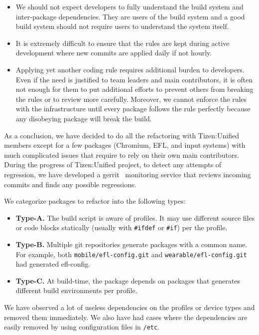 \begin{itemize}
\item We should not expect developers to fully understand the build system and inter-package dependencies.
They are users of the build system and a good build system should not require users to understand the system itself.
\item It is extremely difficult to ensure that the rules are kept during active development where new commits are applied daily if not hourly.
\item Applying yet another coding rule requires additional burden to developers.
Even if the need is justified to team leaders and main contributors, it is often not enough for them to put additional efforts to prevent others from breaking the rules or to review more carefully.
Moreover, we cannot enforce the rules with the infrastructure until every package follows the rule perfectly because any disobeying package will break the build.
\end{itemize}

As a conclusion, we have decided to do all the refactoring with Tizen:Unified members except for a few packages (Chromium, EFL, and input systems) with much complicated issues that require to rely on their own main contributors.
During the progress of Tizen:Unified project, to detect any attempts of regression, we have developed a gerrit~\cite{6GerritURL} monitoring service that reviews incoming commits and finds any possible regressions.


We categorize packages to refactor into the following types:
\begin{itemize}
\item \textbf{Type-A.} The build script is aware of profiles. It may use different source files or code blocks statically (usually with \texttt{\#ifdef} or \texttt{\#if}) per the profile.
\item \textbf{Type-B.} Multiple git repositories generate packages with a common name. For example, both \texttt{mobile/efl-config.git} and \texttt{wearable/efl-config.git} had generated efl-config.
\item \textbf{Type-C.} At build-time, the package depends on packages that generates different build environments per profile.
\end{itemize}

We have observed a lot of useless dependencies on the profiles or device types and removed them immediately.
We also have had cases where the dependencies are easily removed by using configuration files in \texttt{/etc}. 


